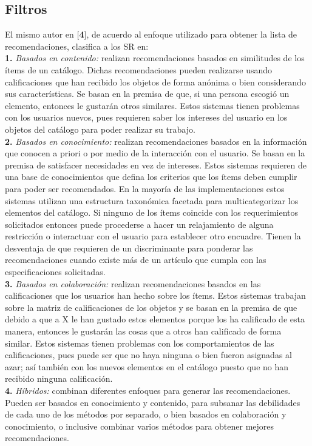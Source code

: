 \documentclass{llncs}
\begin{document}
\subsection{Filtros}
El mismo autor en [\textbf{4}], de acuerdo al enfoque utilizado para obtener la lista de recomendaciones, clasifica a los SR en:\\
\textbf{1.} \textit{Basados en contenido:} realizan recomendaciones basados en similitudes de los ítems de un catálogo. Dichas recomendaciones pueden realizarse usando calificaciones que han recibido los objetos de forma anónima o bien considerando sus características. Se basan en la premisa de que, si una persona escogió un elemento, entonces le gustarán otros similares. Estos sistemas tienen problemas con los usuarios nuevos, pues requieren saber los intereses del usuario en los objetos del catálogo para poder realizar su trabajo.\\
\textbf{2.} \textit{Basados en conocimiento:} realizan recomendaciones basados en la información que conocen a priori o por medio de la interacción con el usuario. Se basan en la premisa de satisfacer necesidades en vez de intereses. Estos sistemas requieren de una base de conocimientos que defina los criterios que los ítems deben cumplir para poder ser recomendados. En la mayoría de las implementaciones estos sistemas utilizan una estructura taxonómica facetada para multicategorizar los elementos del catálogo. Si ninguno de los ítems coincide con los requerimientos solicitados entonces puede procederse a hacer un relajamiento de alguna restricción o interactuar con el usuario para establecer otro encuadre. Tienen la desventaja de que requieren de un discriminante para ponderar las recomendaciones cuando existe más de un artículo que cumpla con las especificaciones solicitadas. \\
\textbf{3.} \textit{Basados en colaboración:} realizan recomendaciones basados en las calificaciones que los usuarios han hecho sobre los ítems. Estos sistemas trabajan sobre la matriz de calificaciones de los objetos y se basan en la premisa de que debido a que a X le han gustado estos elementos porque los ha calificado de esta manera, entonces le gustarán las cosas que a otros han calificado de forma similar. Estos sistemas tienen problemas con los comportamientos de las calificaciones, pues puede ser que no haya ninguna o bien fueron asignadas al azar; así también con los nuevos elementos en el catálogo puesto que no han recibido ninguna calificación.\\
\textbf{4.} \textit{ Híbridos:} combinan diferentes enfoques para generar las recomendaciones. Pueden ser basados en conocimiento y contenido, para subsanar las debilidades de cada uno de los métodos por separado, o bien basados en colaboración y conocimiento, o inclusive combinar varios métodos para obtener mejores recomendaciones.\\
\end{document}
